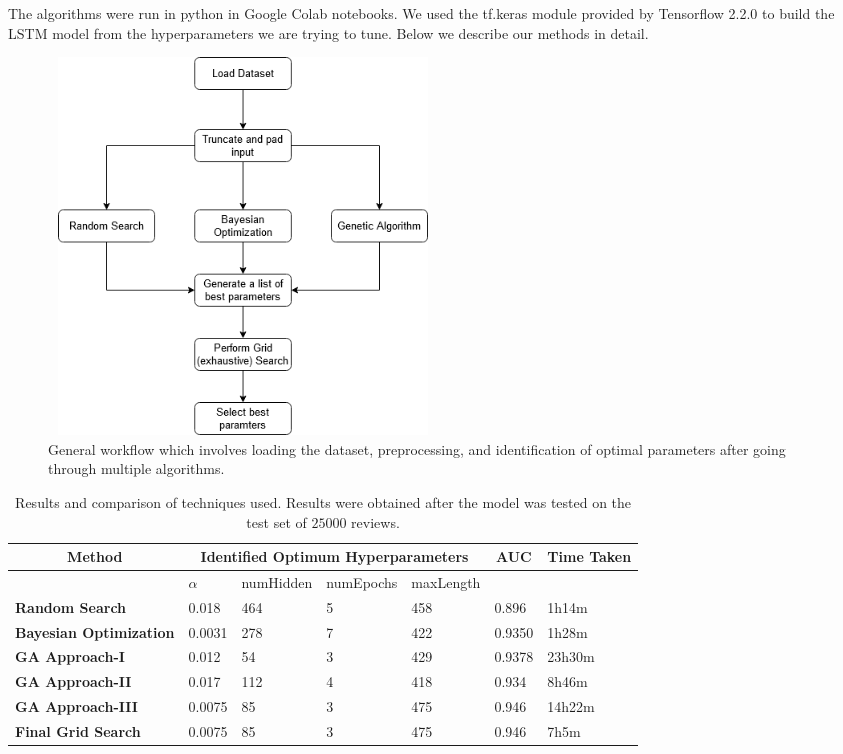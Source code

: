 \documentclass[conference]{IEEEtran}
\begin{document}
The algorithms were run in python in Google Colab notebooks. We used the tf.keras module provided by Tensorflow 2.2.0 to build the LSTM model from the hyperparameters we are trying to tune. Below we describe our methods in detail.

\begin{figure}
\includegraphics[width=0.5\textwidth, height=10cm, keepaspectratio]{flowchart.png}
\caption{ General workflow which involves loading the dataset, preprocessing, and identification of optimal parameters after going through multiple algorithms. }
 \label{fig:flowchart}
\end{figure}


\begin{table}[t]
\fontsize{9pt}{11pt}
\selectfont
\centering

\begin{tabular}{|p{4cm}|p{1cm}|p{1.5cm}|p{1.5cm}|p{1.5cm}|p{1cm}|p{1cm}|}
\hline
\multicolumn{1}{|c}{\textbf{Method}} & \multicolumn{4}{|c}{\textbf{Identified Optimum Hyperparameters}}& \multicolumn{1}{|c}{\textbf{AUC}}& \multicolumn{1}{|c|}{\textbf{Time Taken}}\\ 
\hline
\textbf & $\alpha$ & numHidden & numEpochs & maxLength &  & \\
\hline
\textbf{Random Search} & 0.018 & 464 & 5 & 458 & 0.896 & 1h14m\\
\hline
\textbf{Bayesian Optimization} & 0.0031 & 278 & 7 & 422 & 0.9350 & 1h28m\\ 
\hline
\textbf{GA Approach-I} & 0.012 & 54 & 3 & 429 & 0.9378 & 23h30m\\ 
\hline
\textbf{GA Approach-II} & 0.017 & 112 & 4 & 418 & 0.934 & 8h46m\\ 
\hline
\textbf{GA Approach-III} & 0.0075 & 85 & 3 & 475 & 0.946 & 14h22m\\ 
\hline
\textbf{Final Grid Search} & 0.0075 & 85 & 3 & 475 & 0.946 & 7h5m\\
\hline
\end{tabular}%
\label{tab:inference}
\caption{Results and comparison of techniques used. Results were obtained after the model was tested on the test set of $25000$ reviews.}
\label{tab:res}
\end{table}
\end{document}
